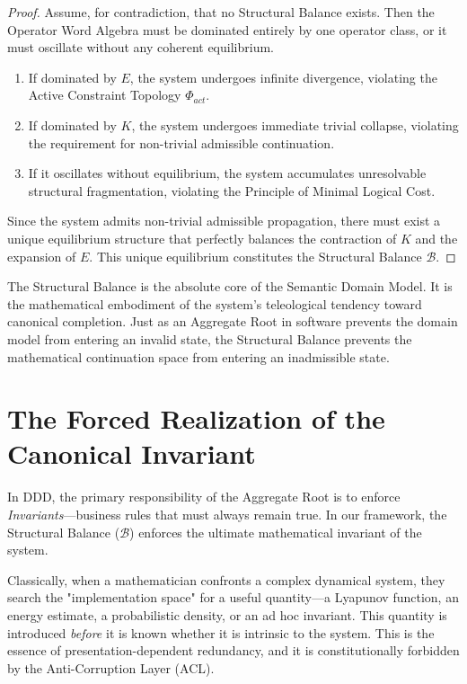 \documentclass[12pt,openany]{extbook}
\theoremstyle{plain}
\theoremstyle{definition}
\begin{document}
\begin{proof}
Assume, for contradiction, that no Structural Balance exists. Then the Operator Word Algebra must be dominated entirely by one operator class, or it must oscillate without any coherent equilibrium. 
\begin{enumerate}
    \item If dominated by $E$, the system undergoes infinite divergence, violating the Active Constraint Topology $\Phi_{act}$.
    \item If dominated by $K$, the system undergoes immediate trivial collapse, violating the requirement for non-trivial admissible continuation.
    \item If it oscillates without equilibrium, the system accumulates unresolvable structural fragmentation, violating the Principle of Minimal Logical Cost.
\end{enumerate}
Since the system admits non-trivial admissible propagation, there must exist a unique equilibrium structure that perfectly balances the contraction of $K$ and the expansion of $E$. This unique equilibrium constitutes the Structural Balance $\mathcal{B}$.
\end{proof}

The Structural Balance is the absolute core of the Semantic Domain Model. It is the mathematical embodiment of the system's teleological tendency toward canonical completion. Just as an Aggregate Root in software prevents the domain model from entering an invalid state, the Structural Balance prevents the mathematical continuation space from entering an inadmissible state.

\section{The Forced Realization of the Canonical Invariant}

In DDD, the primary responsibility of the Aggregate Root is to enforce \emph{Invariants}---business rules that must always remain true. In our framework, the Structural Balance ($\mathcal{B}$) enforces the ultimate mathematical invariant of the system.

Classically, when a mathematician confronts a complex dynamical system, they search the "implementation space" for a useful quantity---a Lyapunov function, an energy estimate, a probabilistic density, or an ad hoc invariant. This quantity is introduced \emph{before} it is known whether it is intrinsic to the system. This is the essence of presentation-dependent redundancy, and it is constitutionally forbidden by the Anti-Corruption Layer (ACL).
\end{document}
